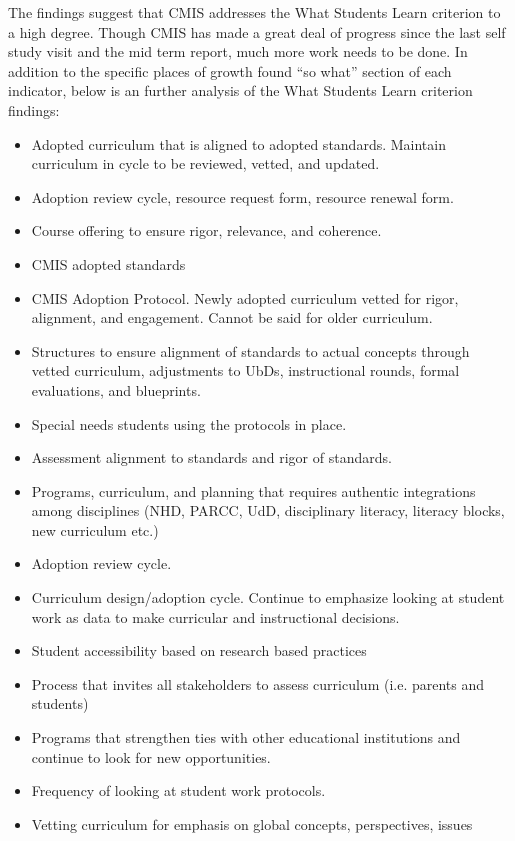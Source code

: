 \documentclass{report}
\begin{document}
\begin{findings}
The findings suggest that CMIS addresses the What Students Learn criterion to a high degree. Though CMIS has made a great deal of progress since the last self study visit and the mid term report, much more work needs to be done. In addition to the specific places of growth found “so what” section of each indicator, below is an further analysis of the What Students Learn criterion findings:


\begin{itemize}
\item Adopted curriculum that is aligned to adopted standards. Maintain curriculum in cycle to be reviewed, vetted, and updated.  
\item Adoption review cycle, resource request form, resource renewal form.
\item Course offering to ensure rigor, relevance, and coherence. 
\item CMIS adopted standards 
\item CMIS Adoption Protocol. Newly adopted curriculum vetted for rigor, alignment, and engagement. Cannot be said for older curriculum. 
\item Structures to ensure alignment of standards to actual concepts through vetted curriculum, adjustments to UbDs, instructional rounds, formal evaluations, and blueprints. 
\item Special needs students using the protocols in place. 
\item Assessment alignment to standards and rigor of standards. 
\item Programs, curriculum, and planning that requires authentic integrations among disciplines (NHD, PARCC, UdD, disciplinary literacy, literacy blocks, new curriculum etc.)
\item Adoption review cycle. 
\item Curriculum design/adoption cycle. Continue to emphasize looking at student work as data to make curricular and instructional decisions. 
\end{itemize}


\begin{itemize}
\item Student accessibility based on research based practices 
\item Process that invites all stakeholders to assess curriculum (i.e. parents and students)
\item Programs that strengthen ties with other educational institutions and continue to look for new opportunities. 
\item Frequency of looking at student work protocols.
\item Vetting curriculum for emphasis on global concepts, perspectives, issues
\end{itemize}


\end{findings}
\end{document}

